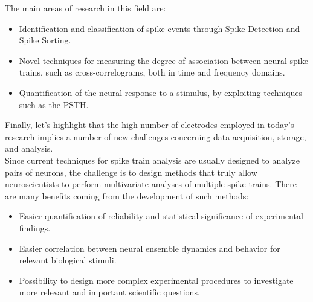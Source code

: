 The main areas of research in this field are:
\begin{itemize}
      \item Identification and classification of spike events through Spike
            Detection and Spike Sorting.
      \item Novel techniques for measuring the degree of association between neural spike trains,
            such as cross-correlograms, both in time and frequency domains.
      \item Quantification of the neural response to a stimulus, by exploiting
            techniques such as the PSTH.
\end{itemize}
Finally, let's highlight that the high number of electrodes employed in
today's research implies a number of new challenges concerning data
acquisition, storage, and analysis.\\
Since current techniques for spike train analysis are usually designed to
analyze pairs of neurons, the challenge is to design methods
that truly allow neuroscientists to perform multivariate analyses of
multiple spike trains.
There are many benefits coming from the development of such methods:
\begin{itemize}
      \item Easier quantification of reliability and statistical
            significance of experimental findings.
      \item Easier correlation between neural ensemble dynamics and behavior
            for relevant biological stimuli.
      \item Possibility to design more complex experimental procedures to
            investigate more relevant and important scientific questions.
\end{itemize}

